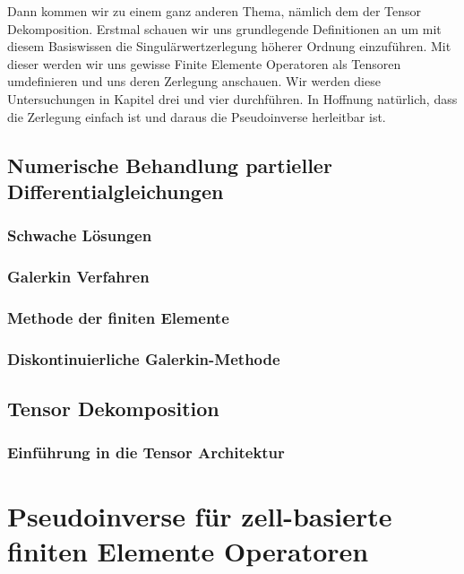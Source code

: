 \documentclass[12pt,a4paper]{scrartcl}
\numberwithin{equation}{section}
\begin{document}
Dann kommen wir zu einem ganz anderen Thema, nämlich dem der Tensor Dekomposition. 
Erstmal schauen wir uns grundlegende Definitionen an um mit diesem Basiswissen die Singulärwertzerlegung höherer Ordnung einzuführen. Mit dieser werden wir uns gewisse Finite Elemente Operatoren als Tensoren umdefinieren und uns deren Zerlegung anschauen. Wir werden diese Untersuchungen in Kapitel drei und vier durchführen. In Hoffnung natürlich, dass die Zerlegung einfach ist und daraus die Pseudoinverse herleitbar ist.


\subsection{Numerische Behandlung partieller Differentialgleichungen}
\subsubsection{Schwache Lösungen}


\subsubsection{Galerkin Verfahren}


\subsubsection{Methode der finiten Elemente}


\subsubsection{Diskontinuierliche Galerkin-Methode}


\newpage
\subsection{Tensor Dekomposition}
\subsubsection{Einführung in die Tensor Architektur}




\newpage
\section{Pseudoinverse für zell-basierte finiten Elemente Operatoren }
\end{document}
